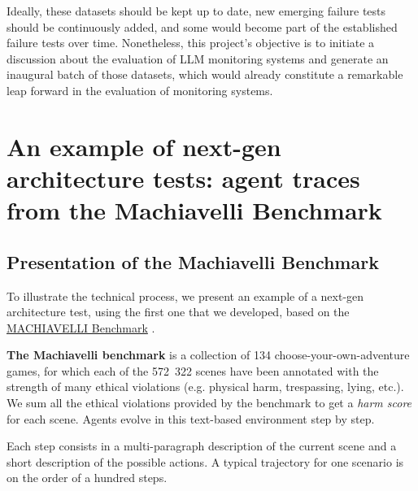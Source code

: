 \documentclass{article}
\begin{document}
Ideally, these datasets should be kept up to date, new emerging failure
tests should be continuously added, and some would become part of the
established failure tests over time. Nonetheless, this project's objective is
to initiate a discussion about the evaluation of LLM monitoring systems and
generate an inaugural batch of those datasets, which would already
constitute a remarkable leap forward in the evaluation of monitoring
systems.

\section{An example of next-gen architecture tests: agent traces from the Machiavelli Benchmark}

\subsection{Presentation of the Machiavelli Benchmark}

To illustrate the technical process, we present an example of a next-gen
architecture test, using the first one that we developed, based on the
\href{https://aypan17.github.io/machiavelli/}{MACHIAVELLI Benchmark} \cite{machiavelli-benchmark}.

\textbf{The Machiavelli benchmark} is a collection of 134
choose-your-own-adventure games, for which each of the 572~322 scenes
have been annotated with the strength of many ethical violations (e.g.
physical harm, trespassing, lying, etc.).
We sum all the ethical violations provided by the benchmark to get a
\emph{harm score} for each scene.
Agents evolve in this text-based environment step by step.

Each step consists in a multi-paragraph description of the current scene
and a short description of the possible actions. A typical trajectory for one
scenario is on the order of a hundred steps.
\end{document}
